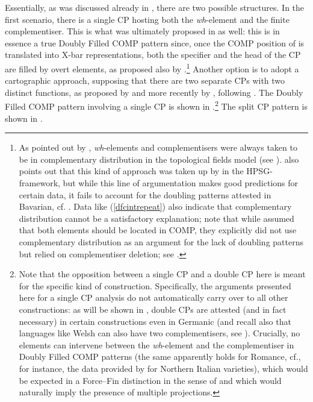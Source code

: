 Essentially, as was discussed already in , there are two possible structures. In the first scenario, there is a single CP hosting both the \textit{wh}-element and the finite complementiser. This is what was ultimately proposed in  as well: this is in essence a true Doubly Filled COMP pattern since, once the COMP position of \citet{chomskylasnik1977} is translated into X-bar representations, both the specifier and the head of the CP are filled by overt elements, as proposed also by \citet{bayer1984}.\footnote{As pointed out by \citet[26]{bayer2015}, \textit{wh}-elements and complementisers were always taken to be in complementary distribution in the topological fields model (see \citealt{hoehle1986}). \citet[26]{bayer2015} also points out that this kind of approach was taken up by \citet{kathol2000} in the HPSG-framework, but while this line of argumentation makes good predictions for certain data, it fails to account for the doubling patterns attested in Bavarian, cf. . Data like (\ref{dfcintrepeat}) also indicate that complementary distribution cannot be a satisfactory explanation; note that while \citet{chomskylasnik1977} assumed that both elements should be located in COMP, they explicitly did not use complementary distribution as an argument for the lack of doubling patterns but relied on complementiser deletion; see .} Another option is to adopt a cartographic approach, supposing that there are two separate CPs with two distinct functions, as proposed by \citet{koopman2000} and more recently by \citet{baltin2010}, following \citet{rizzi1997}. The Doubly Filled COMP pattern involving a single CP is shown in .\footnote{Note that the opposition between a single CP and a double CP here is meant for the specific kind of construction. Specifically, the arguments presented here for a single CP analysis do not automatically carry over to all other constructions: as will be shown in , double CPs are attested (and in fact necessary) in certain constructions even in Germanic (and recall also that languages like Welsh can also have two complementisers, see ). Crucially, no elements can intervene between the \textit{wh}-element and the complementiser in Doubly Filled COMP patterns (the same apparently holds for Romance, cf., for instance, the data provided by \citealt{polettovanelli1997} for Northern Italian varieties), which would be expected in a Force--Fin distinction in the sense of \citet{rizzi1997} and which would naturally imply the presence of multiple projections.} The split CP pattern is shown in .

